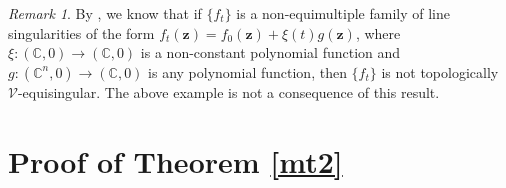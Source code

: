 \documentclass[a4paper,fleqn,11pt]{amsart}
\theoremstyle{definition}
\theoremstyle{remark}
\newtheorem{remark}[theorem]{Remark}
\numberwithin{equation}{section}
\begin{document}
\begin{remark}
By \cite[Corollary 3.7]{ER1}, we know that if $\{f_t\}$ is a non-equimultiple family of line singularities of the form $f_t(\mathbf{z})=f_0(\mathbf{z})+\xi(t)g(\mathbf{z})$, where $\xi\colon (\mathbb{C},0)\to (\mathbb{C},0)$ is a non-constant polynomial function and $g\colon (\mathbb{C}^n,0)\to (\mathbb{C},0)$ is any polynomial function, then $\{f_t\}$ is not topologically $\mathscr{V}$-equisingular. The above example is not a consequence of this result.
\end{remark}

\section{Proof of Theorem \ref{mt2}}\label{prooftheorem}
\end{document}
